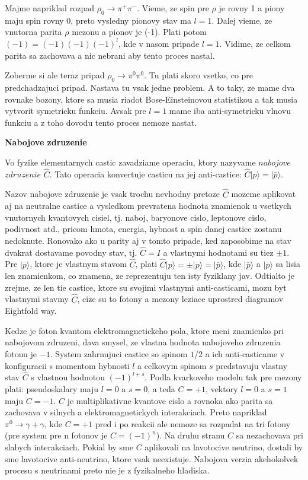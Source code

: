 \documentclass[../../main.tex]{subfiles}
\begin{document}
Majme napriklad rozpad $\rho_0 \rightarrow \pi^+ \pi^-$. Vieme, ze spin pre $\rho$ je rovny 1 a piony maju spin rovny 0, preto vysledny pionovy stav ma $l=1$. Dalej vieme, ze vnutorna parita $\rho$ mezonu a pionov je (-1). Plati potom $(-1)=(-1)(-1)(-1)^l$, kde v nasom pripade $l=1$. Vidime, ze celkom parita sa zachovava a nic nebrani aby tento proces nastal.\par 
Zoberme si ale teraz pripad $\rho_0 \rightarrow \pi^0 \pi^0$. Tu plati skoro vsetko, co pre predchadzajuci pripad. Nastava tu vsak jedne problem. A to taky, ze mame dva rovnake bozony, ktore sa musia riadot Bose-Einsteinovou statistikou a tak musia vytvorit symetricku funkciu. Avsak pre $l=1$ mame iba anti-symetricku vlnovu funkciu a z toho dovodu tento proces nemoze nastat.
 \newline

\textbf{Nabojove zdruzenie}\par
Vo fyzike elementarnych castic zavadziame operaciu, ktory nazyvame $nabojove$ $zdruzenie$ $\hat{C}$.
Tato operacia konvertuje casticu na jej anti-castice: $\hat{C}\lvert{p}\rangle=\lvert{\bar{p}}\rangle$.\par
Nazov nabojove zdruzenie je vsak trochu nevhodny pretoze $\hat{C}$ mozeme aplikovat aj na neutralne castice a vysledkom prevratena hodnota znamienok u vsetkych vnutornych kvantovych cisiel, tj. naboj, baryonove cislo, leptonove cislo, podivnost atd., pricom hmota, energia, hybnost a spin danej castice zostanu nedoknute. Ronovako ako u parity aj v tomto pripade, ked zaposobime na stav dvakrat dostavame povodny stav, tj. $\hat{C}=I$ a vlastnymi hodnotami su tiez $\pm1$. Pre $\lvert p\rangle$, ktore je vlastnym stavom $\hat{C}$, plati $\hat{C}\lvert p\rangle = \pm\vert p \rangle=\lvert\bar{p} \rangle$, kde $\lvert\bar{p} \rangle$ a $\lvert p \rangle$ sa lisia len znamienkom, co znamena, ze reprezentuju ten isty fyziklany jav. Odtialto je zrejme, ze len tie castice, ktore su svojimi vlastnymi anti-casticami, mozu byt vlastnymi stavmy $\hat{C}$, cize su to fotony a mezony leziace uprostred diagramov Eightfold way.\par
Kedze je foton kvantom elektromagnetickeho pola, ktore meni znamienko pri nabojovom zdruzeni, dava smysel, ze vlastna hodnota nabojoveho zdruzenia fotonu je $-1$. System zahrnujuci castice so spinom $1/2$ a ich anti-casticame v konfiguracii s momentom hybnosti $l$ a celkovym spinom $s$ predstavuju vlastny stav $\hat{C}$ s vlastnou hodnotou $(-1)^{l+s}$. Podla kvarkoveho modelu tak pre mezony plati: pseudoskalary maju $l=0$ a $s=0$, a teda $C=+1$, vektory $l=0$ a $s=1$ maju $C=-1$. $C$ je multiplikativne kvantove cislo a rovnoka ako parita sa zachovava v silnych a elektromagnetickych interakciach. Preto napriklad $\pi^0 \rightarrow \gamma + \gamma$, kde $C=+1$ pred i po reakcii ale nemoze sa rozpadat na tri fotony (pre system pre n fotonov je $C=(-1)^n$). Na druhu stranu $C$ sa nezachovava pri slabych interakciach. Pokial by sme $C$ aplikovali na lavotocive neutrino, dostali by sme lavotocive anti-neutrino, ktore vsak neexistuje. Nabojova verzia akehokolvek procesu s neutrinami preto nie je z fyzikalneho hladiska. \newline
\end{document}
